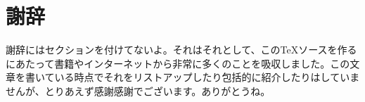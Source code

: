 \chapter{謝辞}
謝辞にはセクションを付けてないよ。それはそれとして、このTeXソースを作るにあたって書籍やインターネットから非常に多くのことを吸収しました。この文章を書いている時点でそれをリストアップしたり包括的に紹介したりはしていませんが、とりあえず感謝感謝でございます。ありがとうね。
